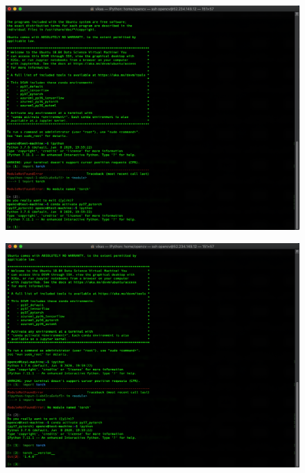 \begin{figure}[H]
\begin{center} 
\includegraphics[scale=0.30]{figures/ssh11}
\end{center}
\end{figure}

\begin{figure}[H]
\begin{center} 
\includegraphics[scale=0.30]{figures/ssh12}
\end{center}
\end{figure}

